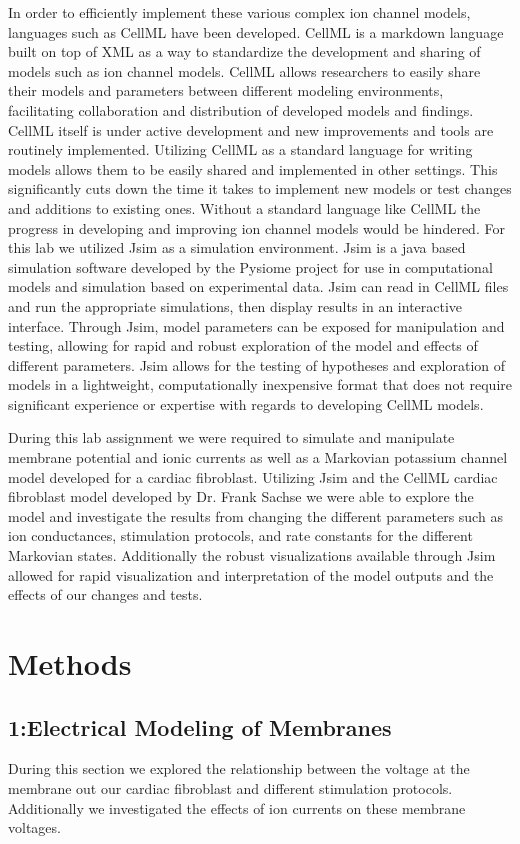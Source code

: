 \documentclass[11pt]{article}
\begin{document}
In order to efficiently implement these various complex ion channel models, languages such as CellML have been developed. CellML is a markdown language built on top of XML as a way to standardize the development and sharing of models such as ion channel models. CellML allows researchers to easily share their models and parameters between different modeling environments, facilitating collaboration and distribution of developed models and findings. CellML itself is under active development and new improvements and tools are routinely implemented. Utilizing CellML as a standard language for writing models allows them to be easily shared and implemented in other settings. This significantly cuts down the time it takes to implement new models or test changes and additions to existing ones. Without a standard language like CellML the progress in developing and improving ion channel models would be hindered. For this lab we utilized Jsim as a simulation environment. Jsim is a java based simulation software developed by the Pysiome project for use in computational models and simulation based on experimental data.\cite{Fink2011} Jsim can read in CellML files and run the appropriate simulations, then display results in an interactive interface. Through Jsim, model parameters can be exposed for manipulation and testing, allowing for rapid and robust exploration of the model and effects of different parameters. Jsim allows for the testing of hypotheses and exploration of models in a lightweight, computationally inexpensive format that does not require significant experience or expertise with regards to developing CellML models.
\par{}
During this lab assignment we were required to simulate and manipulate membrane potential and ionic currents as well as a Markovian potassium channel model developed for a cardiac fibroblast.\cite{Sachse2008} Utilizing Jsim and the CellML cardiac fibroblast model developed by Dr. Frank Sachse we were able to explore the model and investigate the results from changing the different parameters such as ion conductances, stimulation protocols, and rate constants for the different Markovian states. Additionally the robust visualizations available through Jsim allowed for rapid visualization and interpretation of the model outputs and the effects of our changes and tests.

\section{Methods}
\subsection{1:Electrical Modeling of Membranes}
During this section we explored the relationship between the voltage at the membrane out our cardiac fibroblast and different stimulation protocols. Additionally we investigated the effects of ion currents on these membrane voltages.
\end{document}
